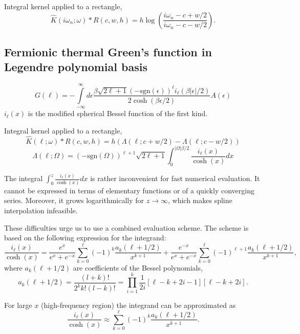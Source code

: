 \documentclass[]{article}
\begin{document}
Integral kernel applied to a rectangle,
\begin{equation}
	\hat K(i\omega_n;\omega)*R(c,w,h) = 
	h \log\left(\frac{i\omega_n - c + w/2}{i\omega_n - c - w/2}\right).
\end{equation}

\subsection{Fermionic thermal Green's function in Legendre polynomial basis}
\label{fermiongf_legendre}
\begin{equation}
	G(\ell) = -\int\limits_{-\infty}^\infty
	d\epsilon \frac{\beta\sqrt{2\ell+1}(-\mathrm{sgn}(\epsilon))^\ell i_{\ell}(\beta|\epsilon|/2)}
	{2\cosh(\beta\epsilon/2)} A(\epsilon)
\end{equation}
$i_\ell(x)$ is the modified spherical Bessel function of the first kind.

Integral kernel applied to a rectangle,
\begin{equation}
	\hat K(\ell;\omega)*R(c,w,h) = h (\Lambda(\ell;c+w/2) - \Lambda(\ell;c-w/2)) 
\end{equation}
\begin{equation}
	\Lambda(\ell;\Omega) = (-\mathrm{sgn}(\Omega))^{\ell+1}\sqrt{2\ell+1}
	\int_0^{|\Omega|\beta/2} \frac{i_\ell(x)}{\cosh(x)} dx
\end{equation}

The integral $\int_0^z \frac{i_\ell(x)}{\cosh(x)} dx$ is rather inconvenient for fast numerical evaluation. It cannot be expressed in terms of elementary functions or of a quickly converging series. Moreover, it grows logarithmically for $z\to\infty$, which makes spline interpolation infeasible.

These difficulties urge us to use a combined evaluation scheme. The scheme is based on the following expression for the integrand:
\begin{equation}\label{il_cosh_series}
	\frac{i_\ell(x)}{\cosh(x)} =
	\frac{e^x}{e^x+e^{-x}}\sum_{k=0}^\ell(-1)^k
		\frac{a_k(\ell+1/2)}{x^{k+1}} +
	\frac{e^{-x}}{e^x+e^{-x}}\sum_{k=0}^\ell(-1)^{\ell+1}
		\frac{a_k(\ell+1/2)}{x^{k+1}},
\end{equation}
where $a_k(\ell+1/2)$ are coefficients of the Bessel polynomials,
\begin{equation}
	a_k(\ell+1/2) = \frac{(l+k)!}{2^k k!(l-k)!} =
	\prod_{i=1}^k \frac{1}{2i}[\ell-k+2i-1][\ell-k+2i].
\end{equation}

For large $x$ (high-frequency region) the integrand can be approximated as
\begin{equation}\label{il_cosh_series_high}
	\frac{i_\ell(x)}{\cosh(x)} \approx
		\sum_{k=0}^\ell(-1)^k \frac{a_k(\ell+1/2)}{x^{k+1}}.
\end{equation}
\end{document}
